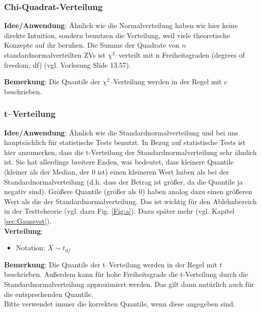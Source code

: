 \documentclass[a4paper]{article}
\newcommand\dangersign[1][2ex]{%
  \renewcommand\stacktype{L}%
  \scaleto{\stackon[1.3pt]{\color{red}$\triangle$}{\tiny !}}{#1}%
}
\begin{document}
\subsubsection{Chi-Quadrat-Verteilung} \label{sec:Chi}

\textbf{Idee/Anwendung}: Ähnlich wie die Normalverteilung haben wir hier keine direkte Intuition, sondern benutzen die Verteilung, weil viele theoretische Konzepte auf ihr beruhen. Die Summe der Quadrate von $n$ standardnormalverteilten ZVs ist $\chi^2$--verteilt mit n Freiheitsgraden (degrees of freedom, df) (vgl. Vorlesung Slide 13.57). 

\noindent \textbf{Bemerkung}: Die Quantile der $\chi^2$--Verteilung werden in der Regel mit $c$ beschrieben.


\subsubsection{t--Verteilung} \label{sec:tdistr}

\textbf{Idee/Anwendung}: Ähnlich wie die Standardnormalverteilung und bei uns hauptsächlich für statistische Tests benutzt. In Bezug auf statistische Tests ist hier anzumerken, dass die t-Verteilung der Standardnormalverteilung sehr ähnlich ist. Sie hat allerdings breitere Enden, was bedeutet, dass kleinere Quantile (kleiner als der Median, der $0$ ist) einen kleineren Wert haben als bei der Standardnormalverteilung (d.h. dass der Betrag ist größer, da die Quantile ja negativ sind). Größere Quantile (größer als $0$) haben analog dazu einen größeren Wert als die der Standardnormalverteilung. Das ist wichtig für den Ablehnbereich in der Testteheorie (vgl. dazu Fig. \ref{Fig:a}). Dazu später mehr (vgl. Kapitel \ref{sec:Gaussvst}). \\

\noindent \textbf{Verteilung}:
\begin{itemize}
\item[] Notation: $X \sim t_{df}$

\end{itemize}

\noindent \textbf{Bemerkung}: Die Quantile der t--Verteilung werden in der Regel mit $t$ beschrieben. Außerdem kann für hohe Freiheitsgrade die t-Verteilung durch die Standardnormalverteilung approximiert werden. Das gilt dann natürlich auch für die entsprechenden Quantile. \\

\noindent \dangersign[3ex] Bitte verwendet immer die korrekten Quantile, wenn diese angegeben sind. \\
\end{document}
